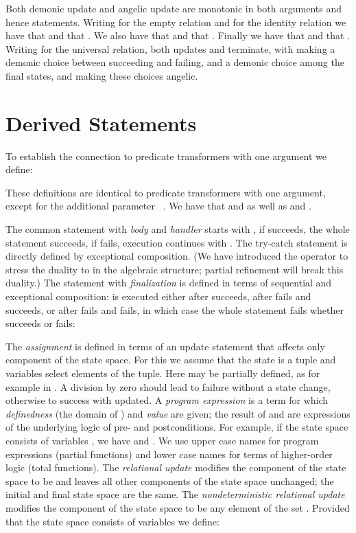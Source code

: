 \documentclass[submission,copyright,creativecommons]{eptcs}
\begin{document}
Both demonic update and angelic update are monotonic in both arguments and hence statements. Writing  for the empty relation and  for the identity relation we have that  and that . We also have that  and that . Finally we have that  and that . Writing  for the universal relation, both updates  and  terminate, with  making a demonic choice between succeeding and failing, and a demonic choice among the final states, and  making these choices angelic.

\section{Derived Statements}
\label{sec:derived}

To establish the connection to predicate transformers with one argument we define:

These definitions are identical to predicate transformers with one argument, except for the additional parameter ~\cite{BackVonWright98RefinementCalculus}. We have that  and  as well as  and .

The common  statement with {\em body}  and {\em handler}  starts with , if  succeeds, the whole statement succeeds, if  fails, execution continues with . The try-catch statement is directly defined by exceptional composition. (We have introduced the operator  to stress the duality to  in the algebraic structure; partial refinement will break this duality.) The statement  with {\em finalization}  is defined in terms of sequential and exceptional composition:  is executed either after  succeeds, after  fails and  succeeds, or after  fails and  fails, in which case the whole statement fails whether  succeeds or fails:

The {\em assignment}  is defined in terms of an update statement that affects only component  of the state space. For this we assume that the state is a tuple and variables select elements of the tuple. Here  may be partially defined, as for example in . A division by zero should lead to failure without a state change, otherwise to success with  updated. A {\em program expression}  is a term for which {\em definedness}  (the domain of ) and {\em value}  are given; the result of  and  are expressions of the underlying logic of pre- and postconditions. For example, if the state space consists of variables , we have  and . We use upper case names  for program expressions (partial functions) and lower case names  for terms of higher-order logic (total functions). The {\em relational update}  modifies the  component of the state space to be  and leaves all other components of the state space unchanged; the initial and final state space are the same. The {\em nondeterministic relational update}  modifies the  component of the state space to be any element of the set . Provided that the state space consists of variables  we define:
\end{document}
